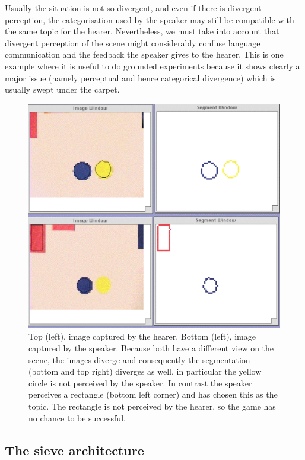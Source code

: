 Usually the situation is not so divergent, and even 
if there is divergent perception, the categorisation
used by the speaker may still be compatible with the 
same topic for the hearer. Nevertheless, we must take into account that divergent perception 
of the scene might considerably confuse language communication and the feedback the speaker gives
to the hearer. This is one example where it is useful to do grounded experiments because it shows 
clearly a major issue (namely perceptual and hence categorical divergence) which is usually swept 
under the carpet. 


\begin{figure}[htbp]
  \centerline{\includegraphics[width=.55\textwidth]{chap3/figs/diff-percept.pdf}}
\caption{Top (left), image captured by the hearer. 
Bottom (left), image captured by the speaker. Because
both have a different view on the scene, the 
images diverge and consequently 
the segmentation (bottom and top right) diverges as well, in particular the yellow 
circle is not perceived by the speaker. In contrast the speaker perceives a rectangle
(bottom left corner) and has chosen this as the topic. The rectangle is not perceived by the 
hearer, so the game has no chance to be successful.}
\label{f:plate12}
\end{figure}

\subsection{The sieve architecture}

